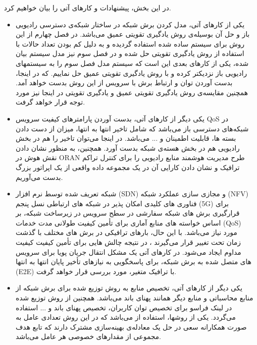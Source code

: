  در این بخش، پیشنهادات و کارهای آتی را بیان خواهیم کرد.
 \begin{itemize}
\item
 یکی از کارهای آتی، مدل کردن برش شبکه در ساختار شبکه‌ی دسترسی رادیویی باز و حل آن بوسیله‌ی روش یادگیری تقویتی عمیق می‌باشد. در فصل چهارم از این روش برای سیستم ساده شده استفاده گردیده و به دلیل کم بودن تعداد حالات با استفاده از روش یادگیری تقویتی حل شده و در فصل سوم نیز مدل سیستم بیان شده، یکی از کارهای بعدی این است که سیستم مدل فصل سوم را به سیستمهای رادیویی باز نزدیکتر کرده و
با روش یادگیری تقویتی عمیق حل نماییم. که در اینجا، بدست آوردن توان و ارتباط برش با سرویس از این روش بدست خواهد آمد. همچنین مقایسه‌ی روش یادگیری تقویتی عمیق و یادگیری تقویتی در اینجا نیز مورد توجه قرار خواهد گرفت.
\item 
یکی دیگر از کارهای آتی، بدست آوردن پارامترهای کیفیت سرویس QoS
در شبکه‌های دسترسی باز می‌باشد که شامل تاخیر انتها به انتها، میزان از دست دادن بسته ها،
قابلیت اطمینان و ... می‌باشد.
در اینجا می‌توان تاخیر را هم در بخش رادیویی هم در بخش هسته‌ی شبکه بدست آورد. 
همچنین،
به منظور نشان دادن نقش هوش در ORAN طرح مدیریت هوشمند منابع رادیویی را برای کنترل تراکم ترافیک و نشان دادن کارایی آن در یک مجموعه داده واقعی از یک اپراتور بزرگ بدست می‌آوریم.
\item 
شبکه تعریف شده توسط نرم افزار (SDN) و مجازی سازی عملکرد شبکه (NFV) فناوری های کلیدی امکان پذیر در شبکه های ارتباطی نسل پنجم (5G) برای قرارگیری برش های شبکه سفارشی در سطح سرویس در زیرساخت شبکه، بر اساس خواسته های منابع آماری برای تأمین کیفیت طولانی مدت خدمات (QoS) مورد نیاز می‌باشد. با این حال، بارهای ترافیکی در برش های مختلف با گذشت زمان تحت تغییر قرار می‌گیرند ، در نتیجه چالش هایی برای تأمین کیفیت کیفیت مداوم ایجاد می‌شود.
در کارهای آتی یک مشکل انتقال جریان پویا برای سرویس های متصل شده به برش شبکه، برای پاسخگویی به نیازهای تأخیر پایان انتها به انتها (E2E) با ترافیک متغیر، مورد بررسی قرار خواهد گرفت.
\item
یکی دیگر از کارهای آتی، تخصیص منابع به روش توزیع شده برای برش شبکه از منابع محاسباتی و منابع دیگر همانند پهنای باند می‌باشد.
همچنین از روش توزیع شده در لینک فراسو  
برای تخصیص توان کاربران، تخصیص پهنای باند و ... استفاده می‌گردد. یکی از روشها، استفاده از 
می‌باشد که در این روش تعدادی عامل به صورت همکارانه سعی در حل یک معادله‌ی بهینه‌سازی مشترک دارند که تابع هدف مجموعی از مقدارهای خصوصی هر عامل ‌می‌باشد. 
 \end{itemize}
 
  
